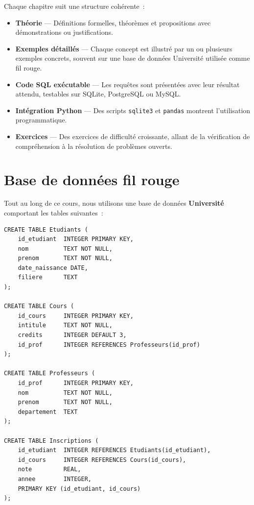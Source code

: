 Chaque chapitre suit une structure coh\'erente~:

\begin{itemize}
    \item \textbf{Th\'eorie} --- D\'efinitions formelles, th\'eor\`emes et propositions
          avec d\'emonstrations ou justifications.
    \item \textbf{Exemples d\'etaill\'es} --- Chaque concept est illustr\'e par un
          ou plusieurs exemples concrets, souvent sur une base de donn\'ees
          \og Universit\'e \fg utilis\'ee comme fil rouge.
    \item \textbf{Code SQL ex\'ecutable} --- Les requ\^etes sont pr\'esent\'ees avec
          leur r\'esultat attendu, testables sur SQLite, PostgreSQL ou MySQL.
    \item \textbf{Int\'egration Python} --- Des scripts \texttt{sqlite3} et
          \texttt{pandas} montrent l'utilisation programmatique.
    \item \textbf{Exercices} --- Des exercices de difficult\'e croissante,
          allant de la v\'erification de compr\'ehension \`a la r\'esolution
          de probl\`emes ouverts.
\end{itemize}

\section*{Base de donn\'ees fil rouge}

Tout au long de ce cours, nous utilisons une base de donn\'ees
\textbf{Universit\'e} comportant les tables suivantes~:

\begin{codeblock}[title=\textbf{Sch\'ema de la base Universit\'e}]
\begin{verbatim}
CREATE TABLE Etudiants (
    id_etudiant  INTEGER PRIMARY KEY,
    nom          TEXT NOT NULL,
    prenom       TEXT NOT NULL,
    date_naissance DATE,
    filiere      TEXT
);

CREATE TABLE Cours (
    id_cours     INTEGER PRIMARY KEY,
    intitule     TEXT NOT NULL,
    credits      INTEGER DEFAULT 3,
    id_prof      INTEGER REFERENCES Professeurs(id_prof)
);

CREATE TABLE Professeurs (
    id_prof      INTEGER PRIMARY KEY,
    nom          TEXT NOT NULL,
    prenom       TEXT NOT NULL,
    departement  TEXT
);

CREATE TABLE Inscriptions (
    id_etudiant  INTEGER REFERENCES Etudiants(id_etudiant),
    id_cours     INTEGER REFERENCES Cours(id_cours),
    note         REAL,
    annee        INTEGER,
    PRIMARY KEY (id_etudiant, id_cours)
);
\end{verbatim}
\end{codeblock}


